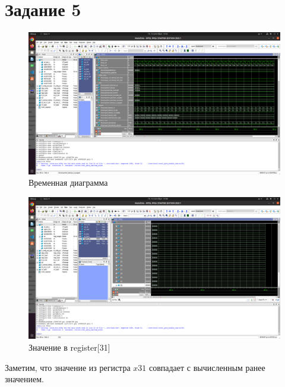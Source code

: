 \section{Задание 5}

\begin{figure}[ht!]
    \centering
    \includegraphics[width=170mm]{./img/task_5_1.png}
    \caption{Временная диаграмма \label{overflow5}}
\end{figure}

\begin{figure}[ht!]
    \centering
    \includegraphics[width=170mm]{./img/task_5_2.png}
    \caption{Значение в register[31] \label{overflow6}}
\end{figure}

Заметим, что значение из регистра $x31$ совпадает с вычисленным ранее значением.

